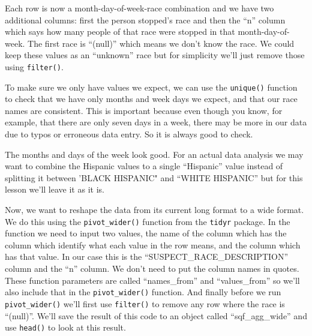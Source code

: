 \documentclass[
]{krantz}
\makeatletter
\newenvironment{Shaded}{\begin{snugshade}}{\end{snugshade}}
\newcommand{\CommentTok}[1]{\textcolor[rgb]{0.37,0.37,0.37}{\textit{#1}}}
\newcommand{\FunctionTok}[1]{\textcolor[rgb]{0,0,0}{#1}}
\newcommand{\NormalTok}[1]{#1}
\newcommand{\SpecialCharTok}[1]{\textcolor[rgb]{0,0,0}{#1}}
\newenvironment{kframe}{%
\medskip{}
\setlength{\fboxsep}{.8em}
 \def\at@end@of@kframe{}%
 \ifinner\ifhmode%
  \def\at@end@of@kframe{\end{minipage}}%
  \begin{minipage}{\columnwidth}%
 \fi\fi%
 \def\FrameCommand##1{\hskip\@totalleftmargin \hskip-\fboxsep
 \colorbox{shadecolor}{##1}\hskip-\fboxsep
     \hskip-\linewidth \hskip-\@totalleftmargin \hskip\columnwidth}%
 \MakeFramed {\advance\hsize-\width
   \@totalleftmargin\z@ \linewidth\hsize
   \@setminipage}}%
 {\par\unskip\endMakeFramed%
 \at@end@of@kframe}
\renewenvironment{Shaded}{\begin{kframe}}{\end{kframe}}
\makeatother
\begin{document}
Each row is now a month-day-of-week-race combination and we have two additional columns: first the person stopped's race and then the ``n'' column which says how many people of that race were stopped in that month-day-of-week. The first race is ``(null)'' which means we don't know the race. We could keep these values as an ``unknown'' race but for simplicity we'll just remove those using \texttt{filter()}.

To make sure we only have values we expect, we can use the \texttt{unique()} function to check that we have only months and week days we expect, and that our race names are consistent. This is important because even though you know, for example, that there are only seven days in a week, there may be more in our data due to typos or erroneous data entry. So it is always good to check.

\begin{Shaded}
\end{Shaded}

The months and days of the week look good. For an actual data analysis we may want to combine the Hispanic values to a single ``Hispanic'' value instead of splitting it between 'BLACK HISPANIC" and ``WHITE HISPANIC'' but for this lesson we'll leave it as it is.

Now, we want to reshape the data from its current long format to a wide format. We do this using the \texttt{pivot\_wider()} function from the \texttt{tidyr} package. In the function we need to input two values, the name of the column which has the column which identify what each value in the row means, and the column which has that value. In our case this is the ``SUSPECT\_RACE\_DESCRIPTION'' column and the ``n'' column. We don't need to put the column names in quotes. These function parameters are called ``names\_from'' and ``values\_from'' so we'll also include that in the \texttt{pivot\_wider()} function. And finally before we run \texttt{pivot\_wider()} we'll first use \texttt{filter()} to remove any row where the race is ``(null)''. We'll save the result of this code to an object called ``sqf\_agg\_wide'' and use \texttt{head()} to look at this result.
\end{document}
